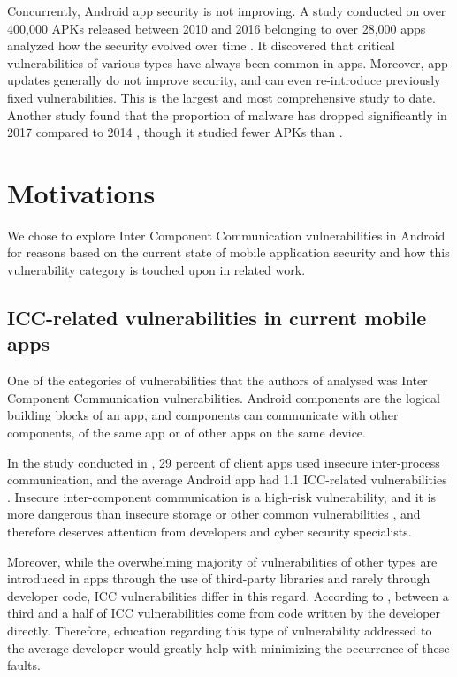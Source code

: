         Concurrently, Android app security is not improving. A study conducted on over 400,000 APKs released between 2010 and 2016 belonging to over 28,000 apps analyzed how the security evolved over time \cite{android_vulnerabilities_evolution}. It discovered that critical vulnerabilities of various types have always been common in apps. Moreover, app updates generally do not improve security, and can even re-introduce previously fixed vulnerabilities. This is the largest and most comprehensive study to date. Another study found that the proportion of malware has dropped significantly in 2017 compared to 2014 \cite{newer_android_vulnerabilities_evolution}, though it studied fewer APKs than \cite{android_vulnerabilities_evolution}.
		
	\section{Motivations}
	    \label{sec:intro_motivations}
	    
	    We chose to explore Inter Component Communication vulnerabilities in Android for reasons based on the current state of mobile application security and how this vulnerability category is touched upon in related work.
	    
	    \subsection{ICC-related vulnerabilities in current mobile apps}
	        \label{subsec:ICC_vulnerabilities_current_apps}
	    
    	One of the categories of vulnerabilities that the authors of \cite{pt_mobile_apps_2019} analysed was Inter Component Communication vulnerabilities. Android components are the logical building blocks of an app, and components can communicate with other components, of the same app or of other apps on the same device.
    	
    	In the study conducted in \cite{pt_mobile_apps_2019}, 29 percent of client apps used insecure inter-process communication, and the average Android app had 1.1 ICC-related vulnerabilities \cite{pt_mobile_apps_2019}. Insecure inter-component communication is a high-risk vulnerability, and it is more dangerous than insecure storage or other common vulnerabilities \cite{pt_mobile_apps_2019}, and therefore deserves attention from developers and cyber security specialists.
		
		Moreover, while the overwhelming majority of vulnerabilities of other types are introduced in apps through the use of third-party libraries and rarely through developer code, ICC vulnerabilities differ in this regard. According to \cite{android_vulnerabilities_evolution}, between a third and a half of ICC vulnerabilities come from code written by the developer directly. Therefore, education regarding this type of vulnerability addressed to the average developer would greatly help with minimizing the occurrence of these faults.
		

